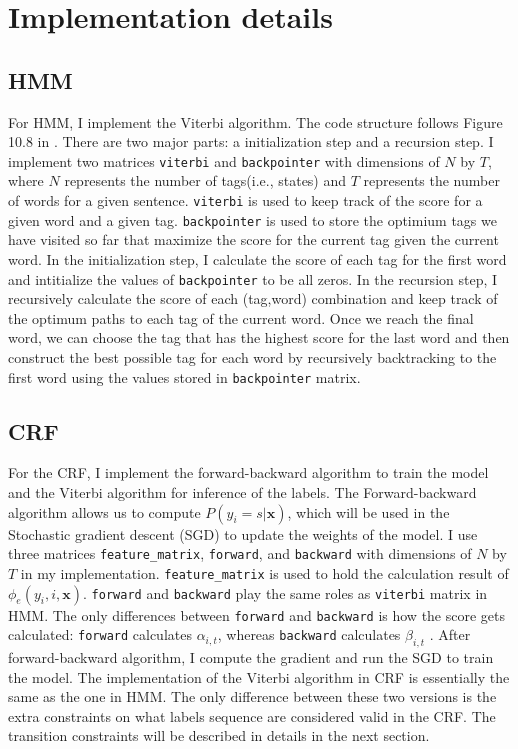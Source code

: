 \documentclass[11pt,a4paper]{article}
\begin{document}
\section{Implementation details}

\subsection{HMM}

For HMM, I implement the Viterbi algorithm. 
The code structure follows Figure 10.8 in \citet{Jurafsky:2017}. There
are two major parts: a initialization step and a recursion step. I implement two matrices
\verb|viterbi| and \verb|backpointer| with dimensions of $N$ by $T$, where
$N$ represents the number of tags(i.e., states) and $T$ represents the number of
words for a given sentence. \verb|viterbi| is used to keep track of the score for 
a given word and a given tag. \verb|backpointer| is used to store the optimium 
tags we have visited so far that maximize the score for the current tag given
the current word. In the initialization step, I calculate the score of each tag
for the first word and intitialize the values of \verb|backpointer| to be all zeros. In the recursion
step, I recursively calculate the score of each (tag,word) combination and keep track
of the optimum paths to each tag of the current word. Once we reach the final word, we can choose the tag that has the
highest score for the last word and then construct the best possible tag for each
word by recursively backtracking to the first word using the values stored 
in \verb|backpointer| matrix.

\subsection{CRF}

For the CRF, I implement the forward-backward
algorithm to train the model and the Viterbi algorithm for inference of the labels.
The Forward-backward algorithm allows us to compute $P(y_i = s|\boldsymbol{x})$,
which will be used in the Stochastic gradient descent (SGD) to update the weights of the model.
I use three matrices \verb|feature_matrix|, \verb|forward|, and \verb|backward| with dimensions
of $N$ by $T$ in my implementation. \verb|feature_matrix| is used to hold the calculation result
of $\phi_e(y_i,i,\boldsymbol{x})$. \verb|forward| and \verb|backward|
play the same roles as \verb|viterbi| matrix in HMM. The only differences between \verb|forward| and
\verb|backward| is how the score gets calculated: \verb|forward| calculates $\alpha_{i,t}$, whereas \verb|backward|
calculates $\beta_{i,t}$ \cite{Marsland:2014}. After forward-backward algorithm, I compute the gradient and
run the SGD to train the model. The implementation of the Viterbi algorithm in CRF is essentially
the same as the one in HMM. The only difference between these two versions is the extra constraints
on what labels sequence are considered valid in the CRF. The transition constraints
will be described in details in the next section.
\end{document}

